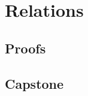 \chapter{Relations}
\label{ch:relations}

\LRAExcludeFromPrintEditionBegin
\section*{Proofs}

\section*{Capstone}

\LRAExcludeFromPrintEditionEnd
